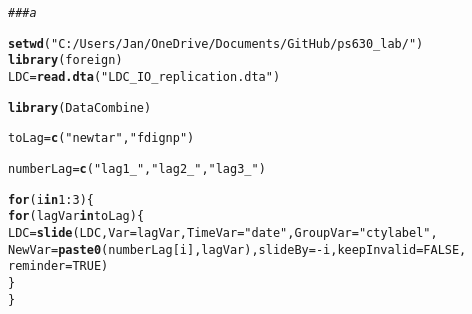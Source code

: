 \documentclass[12pt]{article}\usepackage[]{graphicx}\usepackage[]{color}
\makeatletter
\newcommand{\hlnum}[1]{\textcolor[rgb]{0.686,0.059,0.569}{#1}}%
\newcommand{\hlstr}[1]{\textcolor[rgb]{0.192,0.494,0.8}{#1}}%
\newcommand{\hlcom}[1]{\textcolor[rgb]{0.678,0.584,0.686}{\textit{#1}}}%
\newcommand{\hlopt}[1]{\textcolor[rgb]{0,0,0}{#1}}%
\newcommand{\hlstd}[1]{\textcolor[rgb]{0.345,0.345,0.345}{#1}}%
\newcommand{\hlkwa}[1]{\textcolor[rgb]{0.161,0.373,0.58}{\textbf{#1}}}%
\newcommand{\hlkwb}[1]{\textcolor[rgb]{0.69,0.353,0.396}{#1}}%
\newcommand{\hlkwc}[1]{\textcolor[rgb]{0.333,0.667,0.333}{#1}}%
\newcommand{\hlkwd}[1]{\textcolor[rgb]{0.737,0.353,0.396}{\textbf{#1}}}%
\newenvironment{kframe}{%
 \def\at@end@of@kframe{}%
 \ifinner\ifhmode%
  \def\at@end@of@kframe{\end{minipage}}%
  \begin{minipage}{\columnwidth}%
 \fi\fi%
 \def\FrameCommand##1{\hskip\@totalleftmargin \hskip-\fboxsep
 \colorbox{shadecolor}{##1}\hskip-\fboxsep
     \hskip-\linewidth \hskip-\@totalleftmargin \hskip\columnwidth}%
 \MakeFramed {\advance\hsize-\width
   \@totalleftmargin\z@ \linewidth\hsize
   \@setminipage}}%
 {\par\unskip\endMakeFramed%
 \at@end@of@kframe}
\newenvironment{knitrout}{}{} %
\makeatother
\begin{document}
\begin{knitrout}
\color{fgcolor}\begin{kframe}
\begin{alltt}
\hlcom{### a}

\hlkwd{setwd}\hlstd{(}\hlstr{"C:/Users/Jan/OneDrive/Documents/GitHub/ps630_lab/"}\hlstd{)}
\hlkwd{library}\hlstd{(foreign)}
\hlstd{LDC} \hlkwb{=} \hlkwd{read.dta}\hlstd{(}\hlstr{"LDC_IO_replication.dta"}\hlstd{)}

\hlkwd{library}\hlstd{(DataCombine)}

\hlstd{toLag} \hlkwb{=} \hlkwd{c}\hlstd{(}\hlstr{"newtar"}\hlstd{,} \hlstr{"fdignp"}\hlstd{)}

\hlstd{numberLag} \hlkwb{=} \hlkwd{c}\hlstd{(}\hlstr{"lag1_"}\hlstd{,} \hlstr{"lag2_"}\hlstd{,} \hlstr{"lag3_"}\hlstd{)}

\hlkwa{for} \hlstd{(i} \hlkwa{in} \hlnum{1}\hlopt{:}\hlnum{3}\hlstd{) \{}
    \hlkwa{for} \hlstd{(lagVar} \hlkwa{in} \hlstd{toLag) \{}
        \hlstd{LDC} \hlkwb{=} \hlkwd{slide}\hlstd{(LDC,} \hlkwc{Var} \hlstd{= lagVar,} \hlkwc{TimeVar} \hlstd{=} \hlstr{"date"}\hlstd{,} \hlkwc{GroupVar} \hlstd{=} \hlstr{"ctylabel"}\hlstd{,}
            \hlkwc{NewVar} \hlstd{=} \hlkwd{paste0}\hlstd{(numberLag[i], lagVar),} \hlkwc{slideBy} \hlstd{=} \hlopt{-}\hlstd{i,} \hlkwc{keepInvalid} \hlstd{=} \hlnum{FALSE}\hlstd{,}
            \hlkwc{reminder} \hlstd{=} \hlnum{TRUE}\hlstd{)}
    \hlstd{\}}
\hlstd{\}}
\end{alltt}


{\ttfamily\noindent\itshape\color{messagecolor}{\#\# \\\#\# Lagging newtar by 1 time units.\\\#\# \\\#\# \\\#\# Lagging fdignp by 1 time units.\\\#\# \\\#\# \\\#\# Lagging newtar by 2 time units.\\\#\# \\\#\# \\\#\# Lagging fdignp by 2 time units.\\\#\# \\\#\# \\\#\# Lagging newtar by 3 time units.\\\#\# \\\#\# \\\#\# Lagging fdignp by 3 time units.}}\end{kframe}
\end{knitrout}
\end{document}
